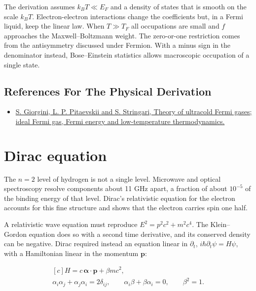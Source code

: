 \documentclass[11pt,oneside]{book}
\newenvironment{centeredalign}{\[\begin{gathered}[c]}{\end{gathered}\]}
\begin{document}
The derivation assumes \(k_BT\ll E_F\) and a density of states that is smooth on the scale \(k_BT\). Electron-electron interactions change the coefficients but, in a Fermi liquid, keep the linear law. When \(T\gg T_F\) all occupations are small and \(f\) approaches the Maxwell--Boltzmann weight. The zero-or-one restriction comes from the antisymmetry discussed under Fermion. With a minus sign in the denominator instead, Bose--Einstein statistics allows macroscopic occupation of a single state.

\subsection*{References For The Physical Derivation}
\begin{itemize}
\item \href{https://arxiv.org/abs/0706.3360}{S. Giorgini, L. P. Pitaevskii and S. Stringari, Theory of ultracold Fermi gases; ideal Fermi gas, Fermi energy and low-temperature thermodynamics.}
\end{itemize}





\clearpage

\section{Dirac equation}

\label{topic:dirac-equation}

The \(n=2\) level of hydrogen is not a single level. Microwave and optical spectroscopy resolve components about 11 GHz apart, a fraction of about \(10^{-5}\) of the binding energy of that level. Dirac's relativistic equation for the electron accounts for this fine structure and shows that the electron carries spin one half.

A relativistic wave equation must reproduce \(E^2=p^2c^2+m^2c^4\). The Klein--Gordon equation does so with a second time derivative, and its conserved density can be negative. Dirac required instead an equation linear in \(\partial_t\), \(i\hbar\partial_t\psi=H\psi\), with a Hamiltonian linear in the momentum \(\mathbf p\):

\begin{centeredalign}
H=c\,\boldsymbol\alpha\cdot\mathbf p+\beta mc^2,\\
\alpha_i\alpha_j+\alpha_j\alpha_i=2\delta_{ij},\qquad
\alpha_i\beta+\beta\alpha_i=0,\qquad \beta^2=1.
\end{centeredalign}
\end{document}
